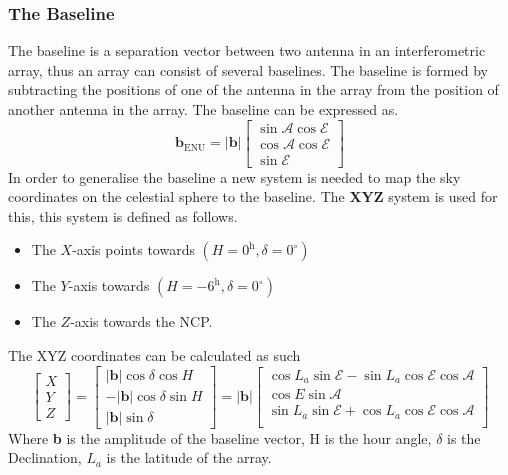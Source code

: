 \subsubsection{The Baseline}
The baseline is a separation vector between two antenna in an interferometric array, thus an array can consist of several baselines. The baseline is formed by subtracting the positions of one of the antenna in the array from the position of another antenna in the array. The baseline can be expressed as. \begin{equation}
\mathbf{b}_{\text{ENU}}
=
\lvert \mathbf{b} \rvert
\begin{bmatrix}
\sin \mathcal{A} \cos \mathcal{E}\\
\cos \mathcal{A} \cos \mathcal{E}\\
\sin \mathcal{E}
\end{bmatrix}
\end{equation}
In order to generalise the baseline a new system is needed to map the sky coordinates on the celestial sphere to the baseline. The \textbf{XYZ} system is used for this, this system is defined as follows.
\begin{itemize}
    \item The $X$-axis points towards $(H=0^\textrm{h}, \delta = 0^{\circ})$ 
    \item The $Y$-axis towards $(H=-6^\textrm{h}, \delta = 0^{\circ})$ 
    \item The $Z$-axis towards the NCP.
\end{itemize}
The XYZ coordinates can be calculated as such
\begin{equation}
\begin{bmatrix}
X\\Y\\Z
\end{bmatrix}=
\begin{bmatrix}
\lvert \mathbf{b} \rvert \cos \delta \cos H\\
-\lvert \mathbf{b} \rvert \cos \delta \sin H\\
\lvert \mathbf{b} \rvert \sin \delta
\end{bmatrix}
= \lvert \mathbf{b} \rvert
\begin{bmatrix}
\cos L_a \sin \mathcal{E} - \sin L_a \cos \mathcal{E} \cos \mathcal{A}\nonumber\\ 
\cos E \sin \mathcal{A} \nonumber\\
\sin L_a \sin \mathcal{E} + \cos L_a \cos \mathcal{E} \cos \mathcal{A}\\
\end{bmatrix}
\end{equation}
Where \textbf{b} is the amplitude of the baseline vector, H is the hour angle, $\delta$ is the Declination, $L_a$ is the latitude of the array.
